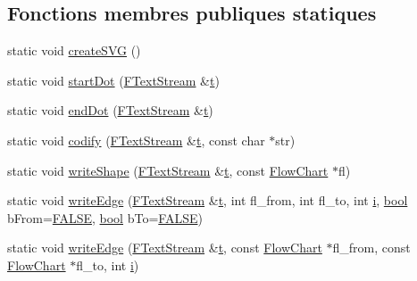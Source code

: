 \subsection*{Fonctions membres publiques statiques}
\begin{DoxyCompactItemize}
\item 
static void \hyperlink{class_flow_chart_a7848f4e846cafbec9e8a6ecca50d4fb2}{create\+S\+V\+G} ()
\item 
static void \hyperlink{class_flow_chart_ad4f3d48005f28f67caf94092bba83f09}{start\+Dot} (\hyperlink{class_f_text_stream}{F\+Text\+Stream} \&\hyperlink{058__bracket__recursion_8tcl_a69e959f6901827e4d8271aeaa5fba0fc}{t})
\item 
static void \hyperlink{class_flow_chart_afe3272c4bd287ec7e0be2d5692c317f0}{end\+Dot} (\hyperlink{class_f_text_stream}{F\+Text\+Stream} \&\hyperlink{058__bracket__recursion_8tcl_a69e959f6901827e4d8271aeaa5fba0fc}{t})
\item 
static void \hyperlink{class_flow_chart_a0e83ebb53eb764f939e3557a33b7fb7e}{codify} (\hyperlink{class_f_text_stream}{F\+Text\+Stream} \&\hyperlink{058__bracket__recursion_8tcl_a69e959f6901827e4d8271aeaa5fba0fc}{t}, const char $\ast$str)
\item 
static void \hyperlink{class_flow_chart_a66031ab509dca5ffed6e6d47a6c0d87f}{write\+Shape} (\hyperlink{class_f_text_stream}{F\+Text\+Stream} \&\hyperlink{058__bracket__recursion_8tcl_a69e959f6901827e4d8271aeaa5fba0fc}{t}, const \hyperlink{class_flow_chart}{Flow\+Chart} $\ast$fl)
\item 
static void \hyperlink{class_flow_chart_ae431d10864639f0aa1eb8aca5dc3ca5e}{write\+Edge} (\hyperlink{class_f_text_stream}{F\+Text\+Stream} \&\hyperlink{058__bracket__recursion_8tcl_a69e959f6901827e4d8271aeaa5fba0fc}{t}, int fl\+\_\+from, int fl\+\_\+to, int \hyperlink{060__command__switch_8tcl_a8c90afd4641b25be86bd09983c3cbee0}{i}, \hyperlink{qglobal_8h_a1062901a7428fdd9c7f180f5e01ea056}{bool} b\+From=\hyperlink{qglobal_8h_a10e004b6916e78ff4ea8379be80b80cc}{F\+A\+L\+S\+E}, \hyperlink{qglobal_8h_a1062901a7428fdd9c7f180f5e01ea056}{bool} b\+To=\hyperlink{qglobal_8h_a10e004b6916e78ff4ea8379be80b80cc}{F\+A\+L\+S\+E})
\item 
static void \hyperlink{class_flow_chart_a5837532d8952aec2d3648498f409b0ce}{write\+Edge} (\hyperlink{class_f_text_stream}{F\+Text\+Stream} \&\hyperlink{058__bracket__recursion_8tcl_a69e959f6901827e4d8271aeaa5fba0fc}{t}, const \hyperlink{class_flow_chart}{Flow\+Chart} $\ast$fl\+\_\+from, const \hyperlink{class_flow_chart}{Flow\+Chart} $\ast$fl\+\_\+to, int \hyperlink{060__command__switch_8tcl_a8c90afd4641b25be86bd09983c3cbee0}{i})

\end{DoxyCompactItemize}
